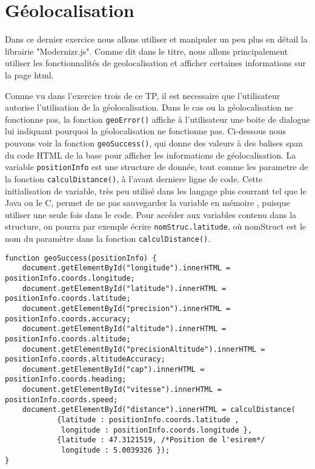 \section{Géolocalisation}
Dans ce dernier exercice nous allons utiliser et manipuler un peu plus en détail la librairie "Modernizr.js". Comme dit dans le titre, nous allons principalement utiliser les fonctionnalités de geolocalisation et afficher certaines informations sur la page html.

Comme vu dans l'exercice trois de ce TP, il est necessaire que l'utilisateur autorise l'utilisation de la géolocalisation. Dans le cas ou la géolocalisation ne fonctionne pas, la fonction \texttt{geoError()} affiche à l'utilisateur une boite de dialogue lui indiquant pourquoi la géolocalisation ne fonctionne pas. Ci-dessous nous pouvons voir la fonction \texttt{geoSuccess()}, qui donne des valeurs à des balises span du code HTML de la base pour afficher les informations de géolocalisation. La variable \texttt{positionInfo} est une structure de donnée, tout comme les parametre de la fonction \texttt{calculDistance()}, à l'avant derniere ligne de code. Cette initialisation de variable, très peu utilisé dans les langage plus courrant tel que le Java ou le C, permet de ne pas sauvegarder la variable en mémoire , puisque utiliser une seule fois dans le code. Pour accéder aux variables contenu dans la structure, on pourra par exemple écrire \texttt{nomStruc.latitude}, où nomStruct est le nom du paramètre dans la fonction \texttt{calculDistance()}.

\begin{verbatim}
function geoSuccess(positionInfo) {
	document.getElementById("longitude").innerHTML = positionInfo.coords.longitude;
	document.getElementById("latitude").innerHTML = positionInfo.coords.latitude;
	document.getElementById("precision").innerHTML = positionInfo.coords.accuracy;
	document.getElementById("altitude").innerHTML = positionInfo.coords.altitude;
	document.getElementById("precisionAltitude").innerHTML = positionInfo.coords.altitudeAccuracy;
	document.getElementById("cap").innerHTML = positionInfo.coords.heading;
	document.getElementById("vitesse").innerHTML = positionInfo.coords.speed;
	document.getElementById("distance").innerHTML = calculDistance(
			{latitude : positionInfo.coords.latitude ,
			 longitude : positionInfo.coords.longitude },
			{latitude : 47.3121519, /*Position de l'esirem*/
			 longitude : 5.0039326 });
}
\end{verbatim}

